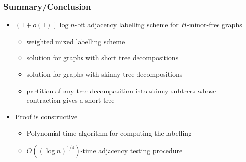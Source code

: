 \documentclass[xcolor=dvipsnames]{beamer}
\begin{document}
\begin{frame}
  \frametitle{Summary/Conclusion}

  \begin{itemize}
    \item $(1+o(1))\log n$-bit adjacency labelling scheme for $H$-minor-free graphs
    \begin{itemize}
      \item weighted mixed labelling scheme
      \item solution for graphs with short tree decompositions
      \item solution for graphs with skinny tree decompositions
      \item partition of any tree decomposition into skinny subtrees whose contraction gives a short tree
    \end{itemize}
    \item Proof is constructive
    \begin{itemize}
      \item Polynomial time algorithm for computing the labelling
      \item $O((\log n)^{1/4})$-time adjacency testing procedure
    \end{itemize}
  \end{itemize}
  \begin{center}
  \end{center}
\end{frame}
\end{document}
